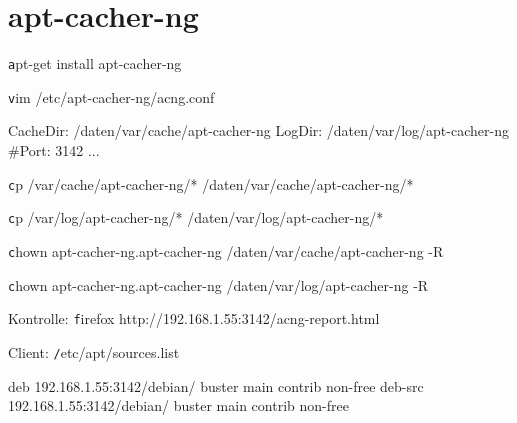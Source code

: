 \section{apt-cacher-ng}

{\texttt apt-get install apt-cacher-ng}

{\texttt vim /etc/apt-cacher-ng/acng.conf}

\begin{verbbox}
CacheDir:		/daten/var/cache/apt-cacher-ng
LogDir:			/daten/var/log/apt-cacher-ng
#Port: 3142
...
\end{verbbox}
\fbox{\theverbbox}

{\texttt cp /var/cache/apt-cacher-ng/* /daten/var/cache/apt-cacher-ng/*}

{\texttt cp /var/log/apt-cacher-ng/* /daten/var/log/apt-cacher-ng/*}

{\texttt chown apt-cacher-ng.apt-cacher-ng /daten/var/cache/apt-cacher-ng -R}

{\texttt chown apt-cacher-ng.apt-cacher-ng /daten/var/log/apt-cacher-ng -R}


Kontrolle:
{\texttt firefox http://192.168.1.55:3142/acng-report.html}

Client:
{\texttt /etc/apt/sources.list}

\begin{verbbox}
deb 192.168.1.55:3142/debian/ buster main contrib non-free
deb-src 192.168.1.55:3142/debian/ buster main contrib non-free

\end{verbbox}
\fbox{\theverbbox}

